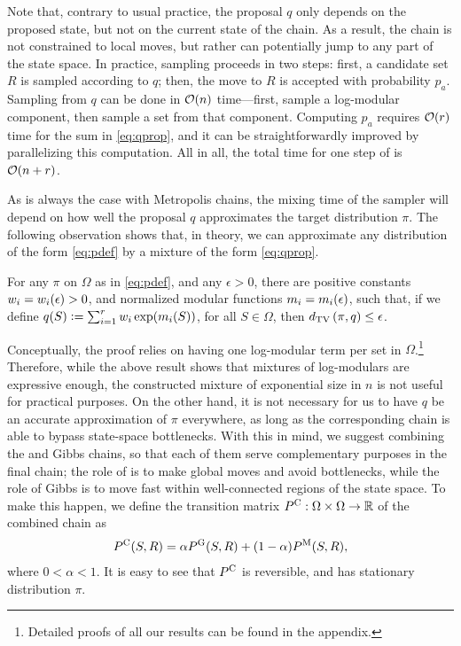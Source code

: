 Note that, contrary to usual practice, the proposal $q$ only depends on the proposed state, but not on the current state of the chain.
As a result, the chain is not constrained to local moves, but rather can potentially jump to any part of the state space.
In practice, \Ms{} sampling proceeds in two steps: first, a candidate set $R$ is sampled according to $q$; then, the move to $R$ is accepted with probability $p_a$.
Sampling from $q$ can be done in $\mathcal{O}(n)$ time---first, sample a log-modular component, then sample a set from that component.
Computing $p_a$ requires $\mathcal{O}(r)$ time for the sum in \eqref{eq:qprop}, and it can be straightforwardly improved by parallelizing this computation.
All in all, the total time for one step of \Ms{} is $\mathcal{O}(n + r)$.

As is always the case with Metropolis chains, the mixing time of the \Ms{} sampler will depend on how well the proposal $q$ approximates the target distribution $\pi$.
The following observation shows that, in theory, we can approximate any distribution of the form \eqref{eq:pdef} by a mixture of the form \eqref{eq:qprop}.

\begin{prop} \label{prop:decomp}
  For any $\pi$ on $\Omega$ as in \eqref{eq:pdef}, and any $\epsilon > 0$, there are positive constants $w_i = w_i(\epsilon) > 0$, and normalized modular functions $m_i = m_i(\epsilon)$, such that, if we define $q(S) \vcentcolon= \sum_{i = 1}^r w_i \exp(m_i(S))$, for all $S \in \Omega$, then $d_{\textrm{TV}}\left( \pi, q \right) \leq \epsilon$.
\end{prop}
Conceptually, the proof relies on having one log-modular term per set in $\Omega$.\footnote{Detailed proofs of all our results can be found in the appendix.}
Therefore, while the above result shows that mixtures of log-modulars are expressive enough, the constructed mixture of exponential size in $n$ is not useful for practical purposes.
On the other hand, it is not necessary for us to have $q$ be an accurate approximation of $\pi$ everywhere, as long as the corresponding \Ms{} chain is able to bypass state-space bottlenecks.
With this in mind, we suggest combining the \Ms{} and Gibbs chains, so that each of them serve complementary purposes in the final chain; the role of \Ms{} is to make global moves and avoid bottlenecks, while the role of Gibbs is to move fast within well-connected regions of the state space.
To make this happen, we define the transition matrix $P^{\mathrm{C}} : \Omega \times \Omega \to \mathbb{R}$ of the combined chain as
\begin{align} \label{eq:cdef}
  P^{\mathrm{C}}(S, R) = \alpha P^{\mathrm{G}}(S, R) + (1-\alpha)P^{\mathrm{M}}(S, R),
\end{align}
where $0 < \alpha < 1$.
It is easy to see that $P^{\mathrm{C}}$ is reversible, and has stationary distribution $\pi$.

